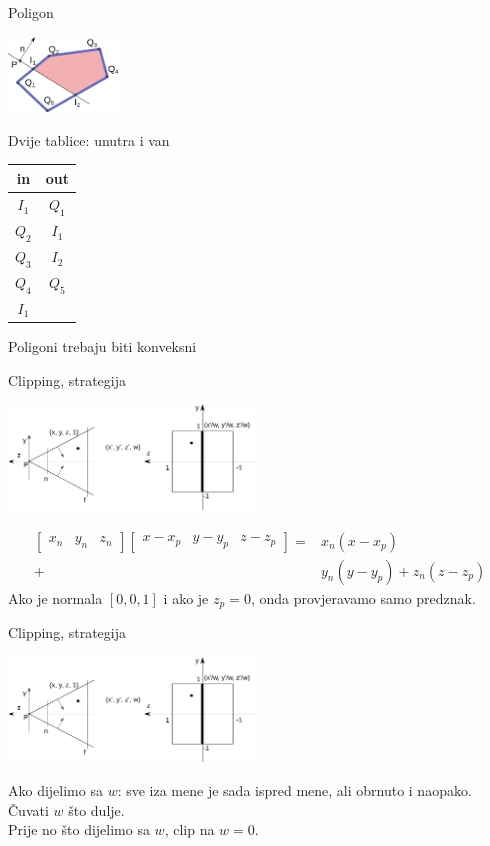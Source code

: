 \documentclass[9pt]{beamer}
\begin{document}
\begin{frame}{Poligon}
	\begin{center}
		\includegraphics[height=2cm]{slike/p05_05.png}
	\end{center}
	Dvije tablice: unutra i van \quad 
	\begin{tabular}{c|c}
		\hline 
		in		& out \\ 
		\hline 
		$I_1$ 	& $Q_1$ \\ 
		$Q_2$ 	& $I_1$ \\ 
		$Q_3$	& $I_2$ \\ 
		$Q_4$	& $Q_5$ \\ 
		$I_1$	& \\
		\hline 
	\end{tabular} 
	Poligoni trebaju biti konveksni
\end{frame}

\begin{frame}{Clipping, strategija}
	\begin{center}
		\includegraphics[height=2.8cm]{slike/p05_06.png}
	\end{center}
	\begin{align*}
	\left[ \begin{array}{ccc}x_n & y_n & z_n \end{array} \right]  \left[ \begin{array}{ccc}x-x_p & y-y_p & z-z_p \end{array} \right] = & x_n(x-x_p)\\
	+&y_n(y-y_p)+z_n(z-z_p)
	\end{align*}
	Ako je normala $\left[0, 0,1\right]$ i ako je $z_p=0$, onda provjeravamo samo predznak.
\end{frame}

\begin{frame}{Clipping, strategija}
	\begin{center}
		\includegraphics[height=2.8cm]{slike/p05_06.png}
	\end{center}
	Ako dijelimo sa $w$: sve iza mene je sada ispred mene, ali obrnuto i naopako.\\
	Čuvati $w$  što dulje. \\
	Prije no što dijelimo sa $w$, clip na $w=0$.
\end{frame}
\end{document}
